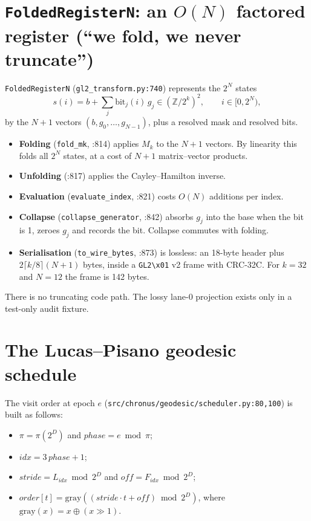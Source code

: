 \documentclass[11pt]{article}
\theoremstyle{definition}
\newcommand{\Z}{\mathbb{Z}}
\newcommand{\code}[1]{\texttt{\small #1}}
\begin{document}
\section{\texttt{FoldedRegisterN}: an $O(N)$ factored register (``we fold, we never truncate'')}
\code{FoldedRegisterN} (\code{gl2\_transform.py:740}) represents the $2^N$ states
\[ s(i)=b+\textstyle\sum_j \mathrm{bit}_j(i)\,g_j\in(\Z/2^k)^2,\qquad i\in[0,2^N), \]
by the $N+1$ vectors $(b,g_0,\dots,g_{N-1})$, plus a resolved mask and resolved bits.
\begin{itemize}
\item \textbf{Folding} (\code{fold\_mk}, :814) applies $M_k$ to the $N+1$ vectors. By linearity this folds all $2^N$
states, at a cost of $N+1$ matrix--vector products.
\item \textbf{Unfolding} (:817) applies the Cayley--Hamilton inverse.
\item \textbf{Evaluation} (\code{evaluate\_index}, :821) costs $O(N)$ additions per index.
\item \textbf{Collapse} (\code{collapse\_generator}, :842) absorbs $g_j$ into the base when the bit is 1, zeroes $g_j$
and records the bit. Collapse commutes with folding.
\item \textbf{Serialisation} (\code{to\_wire\_bytes}, :873) is lossless: an 18-byte header plus $2\lceil k/8\rceil(N+1)$ bytes,
inside a \code{GL2\textbackslash x01} v2 frame with CRC-32C. For $k=32$ and $N=12$ the frame is 142 bytes.
\end{itemize}
There is no truncating code path. The lossy lane-0 projection exists only in a test-only audit fixture.

\section{The Lucas--Pisano geodesic schedule}\label{sec:sched}
The visit order at epoch $e$ (\code{src/chronus/geodesic/scheduler.py:80,100}) is built as follows:
\begin{itemize}
\item $\pi=\pi(2^D)$ and $\mathit{phase}=e\bmod\pi$;
\item $\mathit{idx}=3\,\mathit{phase}+1$;
\item $\mathit{stride}=L_{\mathit{idx}}\bmod2^D$ and $\mathit{off}=F_{\mathit{idx}}\bmod2^D$;
\item $\mathit{order}[t]=\mathrm{gray}((\mathit{stride}\cdot t+\mathit{off})\bmod2^D)$, where $\mathrm{gray}(x)=x\oplus(x\gg1)$.
\end{itemize}
\end{document}
